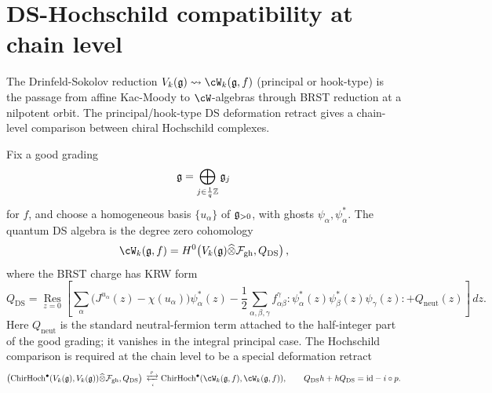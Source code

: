\section{DS-Hochschild compatibility at chain level}
\label{sec:chd-ds}

The Drinfeld-Sokolov reduction $V_k(\fg) \rightsquigarrow \cW_k(\fg, f)$
(principal or hook-type) is the passage from affine Kac-Moody to
$\cW$-algebras through BRST reduction at a nilpotent orbit. The
principal/hook-type DS deformation retract gives a chain-level
comparison between chiral Hochschild complexes.

Fix a good grading
\[
\mathfrak{g}=\bigoplus_{j\in \frac1q\mathbb Z}\mathfrak{g}_j
\]
for \(f\), and choose a homogeneous basis
\(\{u_\alpha\}\) of \(\mathfrak{g}_{>0}\), with ghosts
\(\psi_\alpha,\psi_\alpha^*\).  The quantum DS algebra is the degree
zero cohomology
\begin{equation}
\label{eq:ds-brst-w-algebra}
\cW_k(\fg,f)
=
H^0\!\left(V_k(\fg)\widehat\otimes\cF_{\mathrm{gh}},Q_{\mathrm{DS}}\right),
\end{equation}
where the BRST charge has KRW form
\begin{equation}
\label{eq:ds-brst-charge}
Q_{\mathrm{DS}}
=
\operatorname*{Res}_{z=0}
\left[
\sum_{\alpha}
\bigl(J^{u_\alpha}(z)-\chi(u_\alpha)\bigr)\psi_\alpha^*(z)
-\frac12
\sum_{\alpha,\beta,\gamma}
f_{\alpha\beta}^{\gamma}
:\psi_\alpha^*(z)\psi_\beta^*(z)\psi_\gamma(z):
+Q_{\mathrm{neut}}(z)
\right]\,dz .
\end{equation}
Here \(Q_{\mathrm{neut}}\) is the standard neutral-fermion term attached
to the half-integer part of the good grading; it vanishes in the
integral principal case.  The Hochschild comparison is required at the
chain level to be a special deformation retract
\begin{equation}
\label{eq:ds-hochschild-sdr}
\left(
\ChirHoch^\bullet(V_k(\fg),V_k(\fg))\widehat\otimes
\cF_{\mathrm{gh}},Q_{\mathrm{DS}}
\right)
\;\substack{\xrightarrow{\;p\;}\\[-2pt]\xleftarrow[\;i\;]{} }\;
\ChirHoch^\bullet(\cW_k(\fg,f),\cW_k(\fg,f)),
\qquad
Q_{\mathrm{DS}}h+hQ_{\mathrm{DS}}=\mathrm{id}-i\circ p .
\end{equation}


